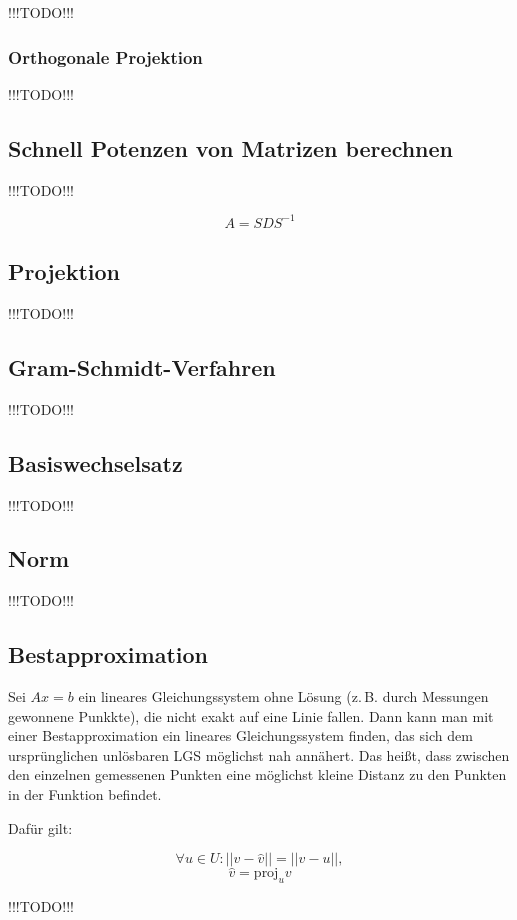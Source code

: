 \documentclass{scrartcl}
\newcommand{\TODO}{{\Huge\textcolor{HeavyRed}{\danger !!!TODO!!! \danger}}}
\begin{document}
\TODO

\subsubsection{Orthogonale Projektion}

\TODO

\subsection{Schnell Potenzen von Matrizen berechnen}

\TODO

\begin{equation}
	A = SDS^{-1}
\end{equation}

\subsection{Projektion}

\TODO


\subsection{Gram-Schmidt-Verfahren}

\TODO

\subsection{Basiswechselsatz}

\TODO

\subsection{Norm}

\TODO

\subsection{Bestapproximation}

Sei $Ax = b$ ein lineares Gleichungssystem ohne Lösung (z.\,B. durch Messungen gewonnene Punkkte), die nicht
exakt auf eine Linie fallen. Dann kann man mit einer Bestapproximation ein lineares Gleichungssystem finden,
das sich dem ursprünglichen unlösbaren LGS möglichst nah annähert. Das heißt, dass zwischen den einzelnen 
gemessenen Punkten eine möglichst kleine Distanz zu den Punkten in der Funktion befindet.

Dafür gilt:

\begin{equation}
	\forall u\in U: ||v - \hat{v}|| = ||v - u||,
\end{equation}
\begin{equation}
	\hat{v} = \text{proj}_uv
\end{equation}

\TODO
\end{document}
